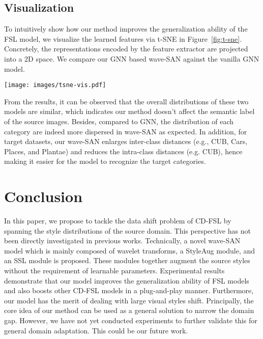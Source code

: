 \documentclass{article}
\begin{document}
\subsection{Visualization}

To intuitively show how our method improves the generalization ability of the FSL model, we visualize the learned features via t-SNE in Figure~\ref{fig:t-sne}. Concretely, the representations encoded by the feature extractor are projected into a 2D space. We compare our GNN based wave-SAN against the vanilla GNN model. 

\begin{figure*}[h]
\centering
\texttt{[image: images/tsne-vis.pdf]}
\caption{\textbf{T-SNE visualization results.} \small A comparison of our wave-SAN and GNN on the mini-Imagenet and four target datasets is given. For each dataset, five categories are randomly sampled. Different colors indicate different categories.}
\label{fig:t-sne} 
\end{figure*}	

From the results, it can be observed that the overall distributions of these two models are similar, which indicates our method doesn't affect the semantic label of the source images. Besides, compared to GNN, the distribution of each category are indeed more dispersed in wave-SAN as expected. In addition, for target datasets, our wave-SAN enlarges inter-class distances (e.g., CUB, Cars, Places, and Plantae) and reduces the intra-class distances (e.g. CUB), hence making it easier for the model to recognize the target categories.



	
\section{Conclusion}
In this paper, we propose to tackle the data shift problem of CD-FSL by spanning the style distributions of the source domain. This perspective has not been directly investigated in previous works. Technically, a novel wave-SAN model which is mainly composed of wavelet transforms, a StyleAug module, and an SSL module is proposed. These modules together augment the source styles without the requirement of learnable parameters. Experimental results demonstrate that our model improves the generalization ability of FSL models and also boosts other CD-FSL models in a plug-and-play manner. Furthermore, our model has the merit of dealing with large visual styles shift.
Principally, the core idea of our method can be used as a general solution to narrow the domain gap. However, we have not yet conducted experiments to further validate this for general domain adaptation. This could be our future work.
\end{document}
